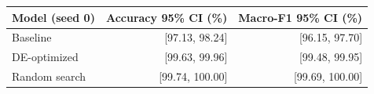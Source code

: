 \begin{tabular}{lrr}
\toprule
Model (seed 0) & Accuracy 95\% CI (\%) & Macro-F1 95\% CI (\%) \\
\midrule
Baseline & [97.13, 98.24] & [96.15, 97.70] \\
DE-optimized & [99.63, 99.96] & [99.48, 99.95] \\
Random search & [99.74, 100.00] & [99.69, 100.00] \\
\bottomrule
\end{tabular}
